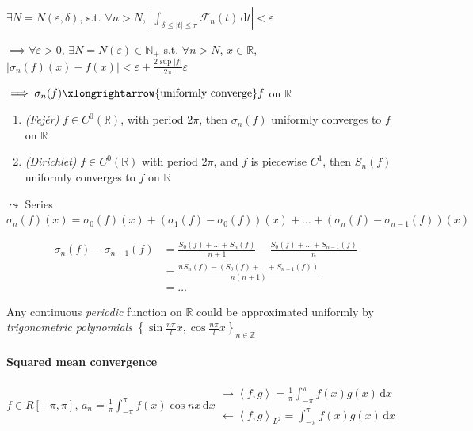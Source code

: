 $\exists N=N(\varepsilon,\delta)$, s.t. $\forall n>N$, $\left|\int_{\delta\leq|t|\leq\pi}\mathcal{F}_n(t)\,\mathrm{d}t\right|<\varepsilon$

$\implies\forall\varepsilon>0$, $\exists N=N(\varepsilon)\in\mathbb{N}_+$ s.t. $\forall n>N$, $x\in\mathbb{R}$, $\left|\sigma_n(f)(x)-f(x)\right|<\varepsilon+\frac{2\sup|f|}{2\pi}\varepsilon$

$\implies\sigma_n(f)\xlongrightarrow{\text{uniformly converge}}f$ on $\mathbb{R}$

\begin{theorem}
    \begin{enumerate}
        \item \emph{(Fejér)} $f\in C^0(\mathbb{R})$, with period $2\pi$, then $\sigma_n(f)$ uniformly converges to $f$ on $\mathbb{R}$
        \item \emph{(Dirichlet)} $f\in C^0(\mathbb{R})$ with period $2\pi$, and $f$ is piecewise $C^1$, then $S_n(f)$ uniformly converges to $f$ on $\mathbb{R}$
    \end{enumerate}

    $\leadsto$ Series $\sigma_n(f)(x)=\sigma_0(f)(x)+\left(\sigma_1(f)-\sigma_0(f)\right)(x)+\dots+\left(\sigma_n(f)-\sigma_{n-1}(f)\right)(x)$

    \begin{align*}
        \sigma_n(f)-\sigma_{n-1}(f)
         & =\frac{S_0(f)+\dots+S_n(f)}{n+1}-\frac{S_0(f)+\dots+S_{n-1}(f)}{n} \\
         & =\frac{nS_n(f)-\left(S_0(f)+\dots+S_{n-1}(f)\right)}{n(n+1)}       \\
         & =\dots
    \end{align*}
\end{theorem}

\begin{corollary}
    Any continuous \emph{periodic} function on $\mathbb{R}$ could be approximated uniformly by \emph{trigonometric polynomials} $\left\{\sin\frac{n\pi}{l}x,\cos\frac{n\pi}{l}x\right\}_{n\in\mathbb{Z}}$
\end{corollary}

\paragraph*{Squared mean convergence}

$f\in R[-\pi,\pi]$, $a_n=\frac{1}{\pi}\int_{-\pi}^{\pi}f(x)\cos nx\,\mathrm{d}x\substack{\rightarrow\left<f,g\right>=\frac{1}{\pi}\int_{-\pi}^{\pi}f(x)g(x)\,\mathrm{d}x\\\leftarrow\left<f,g\right>_{L^2}=\int_{-\pi}^{\pi}f(x)g(x)\,\mathrm{d}x}$

